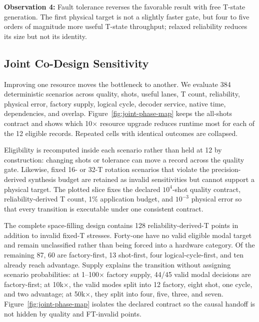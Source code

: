 \begin{observationbox}
\noindent\textbf{Observation 4:} Fault tolerance reverses the favorable result with free T-state generation. The first physical target is not a slightly faster gate, but four to five orders of magnitude more useful T-state throughput; relaxed reliability reduces its size but not its identity.
\end{observationbox}
\FloatBarrier

\subsection{Joint Co-Design Sensitivity}

Improving one resource moves the bottleneck to another. We evaluate 384 deterministic scenarios across quality, shots, useful lanes, T count, reliability, physical error, factory supply, logical cycle, decoder service, native time, dependencies, and overlap. Figure~\ref{fig:joint-phase-map} keeps the all-shots contract and shows which 10$\times$ resource upgrade reduces runtime most for each of the 12 eligible records. Repeated cells with identical outcomes are collapsed.

Eligibility is recomputed inside each scenario rather than held at 12 by construction: changing shots or tolerance can move a record across the quality gate. Likewise, fixed 16- or 32-T rotation scenarios that violate the precision-derived synthesis budget are retained as invalid sensitivities but cannot support a physical target. The plotted slice fixes the declared $10^4$-shot quality contract, reliability-derived T count, 1\% application budget, and $10^{-3}$ physical error so that every transition is executable under one consistent contract.

The complete space-filling design contains 128 reliability-derived-T points in addition to invalid fixed-T stresses. Forty-one have no valid eligible modal target and remain unclassified rather than being forced into a hardware category. Of the remaining 87, 60 are factory-first, 13 shot-first, four logical-cycle-first, and ten already reach advantage. Supply explains the transition without assigning scenario probabilities: at 1--100$\times$ factory supply, 44/45 valid modal decisions are factory-first; at 10k$\times$, the valid modes split into 12 factory, eight shot, one cycle, and two advantage; at 50k$\times$, they split into four, five, three, and seven. Figure~\ref{fig:joint-phase-map} isolates the declared contract so the causal handoff is not hidden by quality and FT-invalid points.

